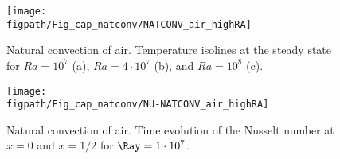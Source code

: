 \begin{figure}
	\begin{center}
		\texttt{[image: \\figpath/Fig\_cap\_natconv/NATCONV\_air\_highRA]} 
	\end{center}
	\caption{Natural convection of air. Temperature isolines at the steady state for $Ra = 10^7$ (a), $Ra = 4 \cdot 10^7$ (b), and  $Ra = 10^8$ (c).}
	\label{fig-natconv-T-highRa}
\end{figure}

\begin{figure}[!ht]
	\begin{center}
		\texttt{[image: \\figpath/Fig\_cap\_natconv/NU-NATCONV\_air\_highRA]} 
	\end{center}
	\caption{Natural convection of air. Time evolution of the Nusselt number at $x=0$ and $x=1/2$ for $\Ray = 1 \cdot 10^7$.}
	\label{fig-natconv-NU-highRa}
\end{figure}

